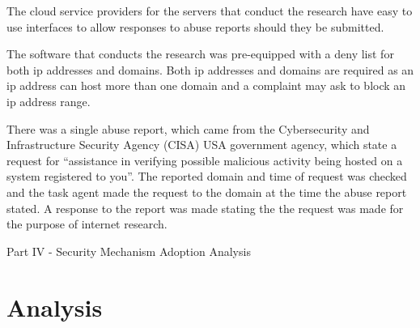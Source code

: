 \documentclass{mscreport}
\begin{document}
\vspace{0.3cm} \noindent
The cloud service providers for the servers that conduct the research have easy to use interfaces to allow responses to abuse reports should they be submitted.

\vspace{0.3cm} \noindent
The software that conducts the research was pre-equipped with a deny list for both ip addresses and domains. Both ip addresses and domains are required as an ip address can host more than one domain and a complaint may ask to block an ip address range.

\vspace{0.3cm} \noindent
There was a single abuse report, which came from the Cybersecurity and Infrastructure Security Agency (CISA) \cite{noauthor_undated-fh} USA government agency, which state a request for ``assistance in verifying possible malicious activity being hosted on a system registered to you''. The reported domain and time of request was checked and the task agent made the request to the domain at the time the abuse report stated. A response to the report was made stating the the request was made for the purpose of internet research.

\newpage

\vspace*{\fill}
\begin{center}
\begin{huge}
Part IV - Security Mechanism Adoption Analysis
\end{huge}
\end{center}
\vspace{\fill}

\newpage


\section{Analysis}
\label{section:analysis}

\newpage






\newpage
\end{document}
